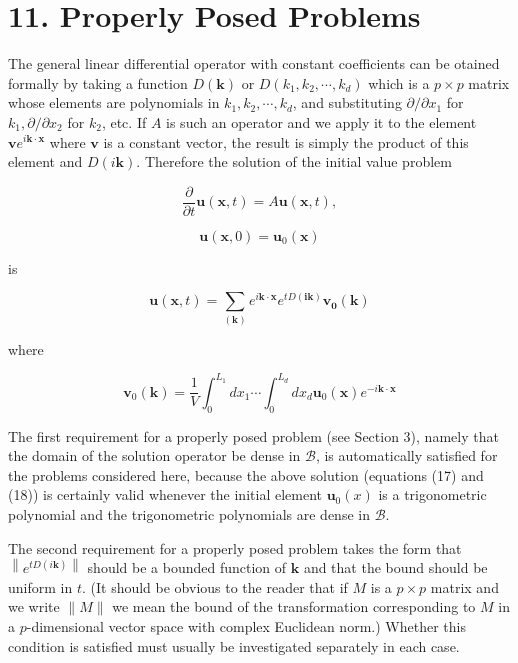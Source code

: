 \documentclass[10pt]{article}
\begin{document}
\section*{11. Properly Posed Problems}
The general linear differential operator with constant coefficients can be otained formally by taking a function \(D(\mathbf{k})\) or \(D\left(k_{1}, k_{2}, \cdots, k_{d}\right)\) which is a \(p \times p\) matrix whose elements are polynomials in \(k_{1}, k_{2}, \cdots, k_{d}\), and substituting \(\partial / \partial x_{1}\) for \(k_{1}, \partial / \partial x_{2}\) for \(k_{2}\), etc. If \(A\) is such an operator and we apply it to the element \(\mathbf{v} e^{i \mathbf{k} \cdot \mathbf{x}}\) where \(\mathbf{v}\) is a constant vector, the result is simply the product of this element and \(D(i \mathbf{k})\). Therefore the solution of the initial value problem

\[
\frac{\partial}{\partial t} \mathbf{u}(\mathbf{x}, t)=A \mathbf{u}(\mathbf{x}, t),
\]

\[
\mathbf{u}(\mathbf{x}, 0)=\mathbf{u}_{0}(\mathbf{x})
\]

is

\[
\mathbf{u}(\mathbf{x}, t)=\sum_{(\mathbf{k})} e^{i \mathbf{k} \cdot \mathbf{x}} e^{t D(\mathbf{i k})} \mathbf{v}_{\mathbf{0}}(\mathbf{k})
\]

where

\[
\mathbf{v}_{0}(\mathbf{k})=\frac{1}{V} \int_{0}^{L_{1}} d x_{1} \cdots \int_{0}^{L_{d}} d x_{d} \mathbf{u}_{0}(\mathbf{x}) e^{-i \mathbf{k} \cdot \mathbf{x}}
\]

The first requirement for a properly posed problem (see Section 3), namely that the domain of the solution operator be dense in \(\mathscr{B}\), is automatically satisfied for the problems considered here, because the above solution (equations (17) and (18)) is certainly valid whenever the initial element \(\mathbf{u}_{0}(x)\) is a trigonometric polynomial and the trigonometric polynomials are dense in \(\mathscr{B}\).

The second requirement for a properly posed problem takes the form that \(\left\|e^{t D(i \mathbf{k})}\right\|\) should be a bounded function of \(\mathbf{k}\) and that the bound should be uniform in \(t\). (It should be obvious to the reader that if \(M\) is a \(p \times p\) matrix and we write \(\|M\|\) we mean the bound of the transformation corresponding to \(M\) in a \(p\)-dimensional vector space with complex Euclidean norm.) Whether this condition is satisfied must usually be investigated separately in each case.
\end{document}
